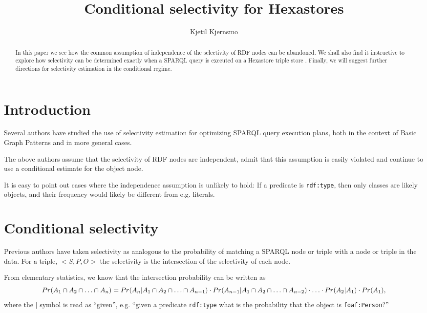 \documentclass[12pt]{article}
\title{Conditional selectivity for Hexastores}
\author{Kjetil Kjernsmo}
\newcommand{\rdfnode}[1]{\texttt{#1}}
\begin{document}
\maketitle

\begin{abstract}
In this paper we see how the common assumption of independence of the
selectivity of RDF nodes can be abandoned. We shall also find it
instructive to explore how selectivity can be determined exactly when
a SPARQL query is executed on a Hexastore triple store
\cite{Weiss:2008:HSI:1453856.1453965}. Finally, we will suggest
further directions for selectivity estimation in the conditional
regime.

\end{abstract}

\section{Introduction}

Several authors have studied the use of selectivity estimation for
optimizing SPARQL query execution plans, both in the context of Basic
Graph Patterns \cite{Stocker:2008:SBG:1367497.1367578} and in more
general cases. %

The above authors assume that the selectivity of RDF nodes are
independent, admit that this assumption is easily violated and
continue to use a conditional estimate for the object node.

It is easy to point out cases where the independence assumption is
unlikely to hold: If a predicate is \rdfnode{rdf:type}, then only
classes are likely objects, and their frequency  would likely be
different from e.g. literals.

\section{Conditional selectivity}

Previous authors have taken selectivity as analogous to the
probability of matching a SPARQL node or triple with a node or triple
in the data. For a triple, $<S, P, O>$ the selectivity is the
intersection of the selectivity of each node.

From elementary statistics, we know that the intersection probability
can be written as
\begin{equation}
Pr(A_1 \cap A_2  \cap \ldots \cap A_n) = 
  Pr(A_n | A_1 \cap A_2  \cap \ldots \cap A_{n-1}) \\
  \cdot Pr(A_{n-1} | A_1 \cap A_2  \cap \ldots \cap A_{n-2}) 
  \cdot \ldots \cdot Pr(A_2 | A_1) \cdot Pr(A_1) ,
\end{equation}
where the $|$ symbol is read as ``given'', e.g. ``given a predicate
\rdfnode{rdf:type} what is the probability that the object is \rdfnode{foaf:Person}?''
\end{document}
